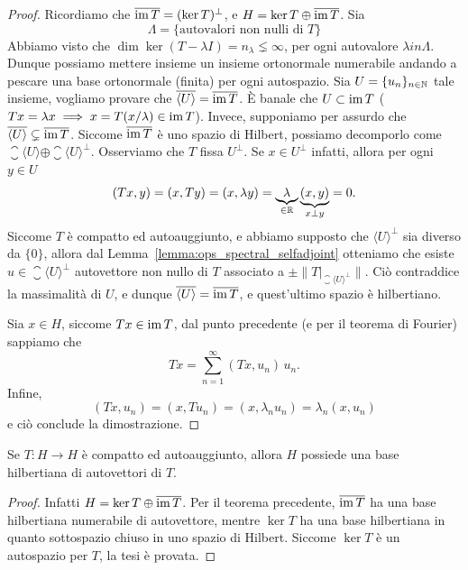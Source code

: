 \begin{proof}
	Ricordiamo che $\overline{\operatorname{im} T} = (\ker T)^\perp$, e $H= \ker T \oplus \overline{\operatorname{im} T}$. Sia
	\begin{equation*}
		\Lambda = \{ \text{autovalori non nulli di $T$} \}
	\end{equation*}
	Abbiamo visto che $\dim \ker (T -\lambda I) = n_\lambda \lneq \infty$, per ogni autovalore $\lambda in \Lambda$. Dunque possiamo mettere insieme un insieme ortonormale numerabile andando a pescare una base ortonormale (finita) per ogni autospazio.
	Sia $U=\{u_n\}_{n \in \mathbb{N}}$ tale insieme, vogliamo provare che $\overline{\langle U \rangle} = \overline{\operatorname{im} T}$.
	È banale che $U \subset \operatorname{im} T$ ($Tx = \lambda x \implies x = T(x/\lambda) \in \operatorname{im} T$).
	Invece, supponiamo per assurdo che $\overline{\langle U \rangle } \subsetneq \overline{\operatorname{im} T}$. Siccome $\overline{\operatorname{im} T}$ è uno spazio di Hilbert, possiamo decomporlo come $\closure{\langle U \rangle} \oplus \closure{\langle U \rangle}^\perp$.
	Osserviamo che $T$ fissa $U^\perp$. Se $x \in U^\perp$ infatti, allora per ogni $y \in U$
	\begin{equation}
		(Tx,y) = (x,Ty) = (x, \lambda y) = \underbrace{\lambda}_{\in \mathbb{R}} \underbrace{(x,y)}_{x \perp y} = 0.
	\end{equation}
	Siccome $T$ è compatto ed autoauggiunto, e abbiamo supposto che $\langle U \rangle^\perp$ sia diverso da $\{0\}$, allora dal Lemma~\ref{lemma:ops_spectral_selfadjoint} otteniamo che esiste $u \in \closure{\langle U \rangle}^\perp$ autovettore non nullo di $T$ associato a $\pm \|T\vert_{\closure{\langle U \rangle}^\perp}\|$. Ciò contraddice la massimalità di $U$, e dunque $\overline{\langle U \rangle} = \overline{\operatorname{im} T}$, e quest'ultimo spazio è hilbertiano.

	Sia $x \in H$, siccome $Tx \in \operatorname{im} T$, dal punto precedente (e per il teorema di Fourier) sappiamo che
	\begin{equation*}
		Tx = \sum_{n=1}^\infty (Tx, u_n)\,u_n.
	\end{equation*}
	Infine,
	\begin{equation*}
		(Tx, u_n) = (x, Tu_n) = (x, \lambda_n u_n) = \lambda_n (x, u_n)
	\end{equation*}
	e ciò conclude la dimostrazione.
\end{proof}

\begin{corollary}
	Se $T:H \to H$ è compatto ed autoauggiunto, allora $H$ possiede una base hilbertiana di autovettori di $T$.
\end{corollary}
\begin{proof}
	Infatti $H = \ker T \oplus \overline{\operatorname{im} T}$. Per il teorema precedente, $\overline{\operatorname{im} T}$ ha una base hilbertiana numerabile di autovettore, mentre $\ker T$ ha una base hilbertiana in quanto sottospazio chiuso in uno spazio di Hilbert. Siccome $\ker T$ è un autospazio per $T$, la tesi è provata.
\end{proof}

